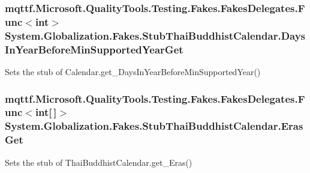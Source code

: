 \hypertarget{class_system_1_1_globalization_1_1_fakes_1_1_stub_thai_buddhist_calendar_aedce832b4f7ce261e8f18144b17dbdfd}{
\subsubsection[{Days\-In\-Year\-Before\-Min\-Supported\-Year\-Get}]{\setlength{\rightskip}{0pt plus 5cm}mqttf.\-Microsoft.\-Quality\-Tools.\-Testing.\-Fakes.\-Fakes\-Delegates.\-Func$<$int$>$ System.\-Globalization.\-Fakes.\-Stub\-Thai\-Buddhist\-Calendar.\-Days\-In\-Year\-Before\-Min\-Supported\-Year\-Get}}\label{class_system_1_1_globalization_1_1_fakes_1_1_stub_thai_buddhist_calendar_aedce832b4f7ce261e8f18144b17dbdfd}


Sets the stub of Calendar.\-get\-\_\-\-Days\-In\-Year\-Before\-Min\-Supported\-Year()

\hypertarget{class_system_1_1_globalization_1_1_fakes_1_1_stub_thai_buddhist_calendar_a08f1178d956f936ffb06d86581fc8b4f}{
\subsubsection[{Eras\-Get}]{\setlength{\rightskip}{0pt plus 5cm}mqttf.\-Microsoft.\-Quality\-Tools.\-Testing.\-Fakes.\-Fakes\-Delegates.\-Func$<$int\mbox{[}$\,$\mbox{]}$>$ System.\-Globalization.\-Fakes.\-Stub\-Thai\-Buddhist\-Calendar.\-Eras\-Get}}\label{class_system_1_1_globalization_1_1_fakes_1_1_stub_thai_buddhist_calendar_a08f1178d956f936ffb06d86581fc8b4f}


Sets the stub of Thai\-Buddhist\-Calendar.\-get\-\_\-\-Eras()

